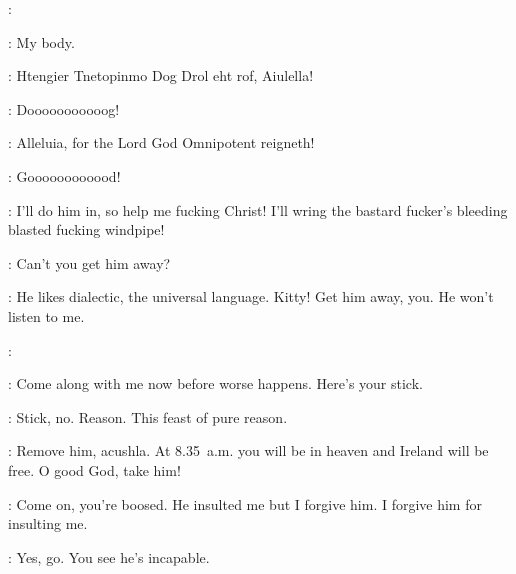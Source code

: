 \FrMalachiOFlynn:

\HainesLove:
My body.

\VoiceAllDamned:
Htengier Tnetopinmo Dog Drol eht rof,
Aiulella!


\Adonai:
Dooooooooooog!

\VoiceAllBlessed:
Alleluia, for the Lord God Omnipotent reigneth!


\Adonai:
Goooooooooood!


\Carr:
I'll do him in, so help me fucking Christ!
I'll wring the bastard fucker's bleeding blasted fucking windpipe!


\Bloom:
Can't you get him away?

\Lynch:
He likes dialectic, the universal language.
Kitty!
Get him away, you.
He won't listen to me.


\Stephen:

\Bloom:
Come along with me now before worse happens.
Here's your stick.

\Stephen:
Stick, no.
Reason.
This feast of pure reason.

\GummyGranny:
Remove him, acushla.
At 8.35~a.m. you will be in heaven and Ireland will be free.
O good God, take him!

\Cissy:
Come on, you're boosed.
He insulted me but I forgive him.
I forgive him for insulting me.

\Bloom:
Yes, go.
You see he's incapable.

